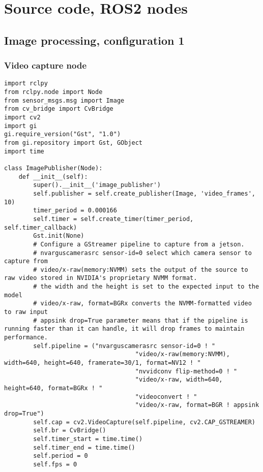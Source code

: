 \section{Source code, ROS2 nodes}

\subsection{Image processing, configuration 1}

\subsubsection{Video capture node}

\begin{lstlisting}[language=PythonPlus, basicstyle=\tiny,]
import rclpy
from rclpy.node import Node
from sensor_msgs.msg import Image
from cv_bridge import CvBridge
import cv2
import gi
gi.require_version("Gst", "1.0")
from gi.repository import Gst, GObject
import time

class ImagePublisher(Node):
    def __init__(self):
        super().__init__('image_publisher')
        self.publisher = self.create_publisher(Image, 'video_frames', 10)
        timer_period = 0.000166
        self.timer = self.create_timer(timer_period, self.timer_callback)
        Gst.init(None)
        # Configure a GStreamer pipeline to capture from a jetson.
        # nvarguscamerasrc sensor-id=0 select which camera sensor to capture from
        # video/x-raw(memory:NVMM) sets the output of the source to raw video stored in NVIDIA's proprietary NVMM format.
        # the width and the height is set to the expected input to the model
        # video/x-raw, format=BGRx converts the NVMM-formatted video to raw input
        # appsink drop=True parameter means that if the pipeline is running faster than it can handle, it will drop frames to maintain performance.
        self.pipeline = ("nvarguscamerasrc sensor-id=0 ! "
                                    "video/x-raw(memory:NVMM), width=640, height=640, framerate=30/1, format=NV12 ! "
                                    "nvvidconv flip-method=0 ! "
                                    "video/x-raw, width=640, height=640, format=BGRx ! "
                                    "videoconvert ! "
                                    "video/x-raw, format=BGR ! appsink drop=True")
        self.cap = cv2.VideoCapture(self.pipeline, cv2.CAP_GSTREAMER)
        self.br = CvBridge()
        self.timer_start = time.time()
        self.timer_end = time.time()
        self.period = 0
        self.fps = 0


\end{lstlisting}
